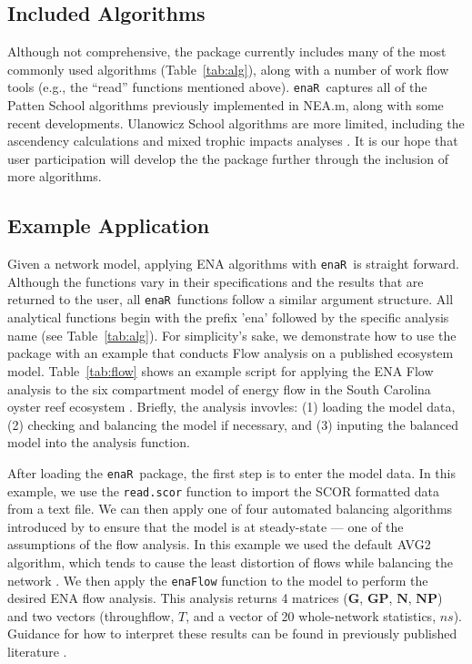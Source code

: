 \documentclass[11pt]{article}
\newcommand{\enaR}{\texttt{enaR}}
\begin{document}
\begin{spacing}{2}
\subsection{Included Algorithms}
Although not comprehensive, the package currently includes many of the
most commonly used algorithms (Table~\ref{tab:alg}), along with a
number of work flow tools (e.g., the ``read'' functions mentioned
above).  \enaR\ captures all of the Patten School algorithms
previously implemented in NEA.m, along with some recent developments.
Ulanowicz School algorithms are more limited, including the ascendency
calculations \citep{ulanowicz97} and mixed trophic impacts analyses
\citep{ulanowicz90}.  It is our hope that user participation will
develop the the package further through the inclusion of more
algorithms.

\subsection{Example Application}
Given a network model, applying ENA algorithms with \enaR\ is straight
forward. Although the functions vary in their specifications and the
results that are returned to the user, all \enaR\ functions follow a
similar argument structure.  All analytical functions begin with the
prefix 'ena' followed by the specific analysis name (see
Table~\ref{tab:alg}). For simplicity's sake, we demonstrate how to use
the package with an example that conducts Flow analysis on a published
ecosystem model. Table~\ref{tab:flow} shows an example script for
applying the ENA Flow analysis to the six compartment model of energy
flow in the South Carolina oyster reef ecosystem
\citep{dame81}. Briefly, the analysis invovles: (1) loading the model
data, (2) checking and balancing the model if necessary, and (3)
inputing the balanced model into the analysis function.

After loading the \enaR\ package, the first step is to enter the model
data.  In this example, we use the \texttt{read.scor} function to import
the SCOR formatted data from a text file.  We can then apply one of
four automated balancing algorithms introduced by \citet[AVG,
  Input-Output, Output-Input, AVG2,][]{allesina03} to ensure that the
model is at steady-state --- one of the assumptions of the flow
analysis.  In this example we used the default AVG2 algorithm, which
tends to cause the least distortion of flows while balancing the
network \citep{allesina03}.  We then apply the \texttt{enaFlow}
function to the model to perform the desired ENA flow analysis.  This
analysis returns 4 matrices ($\mathbf{G}$, $\mathbf{GP}$,
$\mathbf{N}$, $\mathbf{NP}$) and two vectors (throughflow, $T$, and a
vector of 20 whole-network statistics, $ns$).  Guidance for how to
interpret these results can be found in previously published
literature \citep{fath06, schramski11}.


\end{spacing}
\end{document}
